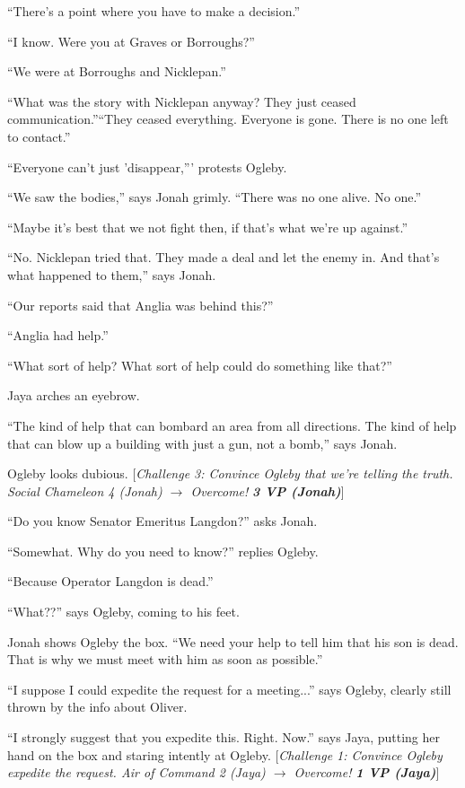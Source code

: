 ``There's a point where you have to make a decision.''

``I know.  Were you at Graves or Borroughs?''

``We were at Borroughs and Nicklepan.''

``What was the story with Nicklepan anyway?  They just ceased communication.''``They ceased everything.  Everyone is gone.  There is no one left to contact.''

``Everyone can't just 'disappear,''' protests Ogleby.

``We saw the bodies,'' says Jonah grimly. ``There was no one alive.  No one.''

``Maybe it's best that we not fight then, if that's what we're up against.''

``No.  Nicklepan tried that.  They made a deal and let the enemy in.  And that's what happened to them,'' says Jonah.

``Our reports said that Anglia was behind this?''

``Anglia had help.''

``What sort of help?  What sort of help could do something like that?''

Jaya arches an eyebrow.

``The kind of help that can bombard an area from all directions.  The kind of help that can blow up a building with just a gun, not a bomb,'' says Jonah.

Ogleby looks dubious.  {[}\textit{Challenge 3: Convince Ogleby that we're telling the truth. Social Chameleon 4 (Jonah) $\rightarrow$ Overcome! }\textit{\textbf{3 VP (Jonah)}}{]} 



``Do you know Senator Emeritus Langdon?'' asks Jonah.

``Somewhat. Why do you need to know?'' replies Ogleby.

``Because Operator Langdon is dead.''

``What??'' says Ogleby, coming to his feet.

Jonah shows Ogleby the box.  ``We need your help to tell him that his son is dead.  That is why we must meet with him as soon as possible.''

``I suppose I could expedite the request for a meeting...'' says Ogleby, clearly still thrown by the info about Oliver.

``I strongly suggest that you expedite this. Right.  Now.'' says Jaya, putting her hand on the box and staring intently at Ogleby. {[}\textit{Challenge 1: Convince Ogleby expedite the request. Air of   Command 2 (Jaya) $\rightarrow$ Overcome! }\textit{\textbf{1 VP (Jaya)}}{]} 

